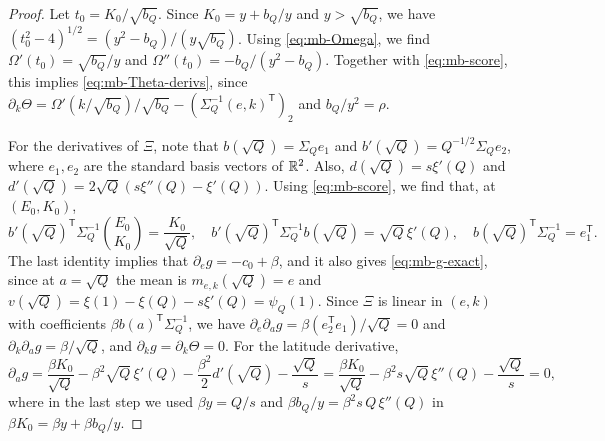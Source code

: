 \begin{proof}
Let $t_0=K_0/\sqrt{b_Q}$. Since $K_0=y+b_Q/y$ and $y>\sqrt{b_Q}$, we have $(t_0^2-4)^{1/2}=(y^2-b_Q)/(y\sqrt{b_Q})$. Using \eqref{eq:mb-Omega}, we find $\Omega'(t_0)=\sqrt{b_Q}/y$ and $\Omega''(t_0)=-b_Q/(y^2-b_Q)$. Together with \eqref{eq:mb-score}, this implies \eqref{eq:mb-Theta-derivs}, since $\partial_k\Theta=\Omega'(k/\sqrt{b_Q})/\sqrt{b_Q}-(\Sigma_Q^{-1}(e,k)^{\mathsf T})_2$ and $b_Q/y^2=\rho$.

For the derivatives of $\Xi$, note that $b(\sqrt Q)=\Sigma_Qe_1$ and $b'(\sqrt Q)=Q^{-1/2}\Sigma_Qe_2$, where $e_1,e_2$ are the standard basis vectors of $\mathbb R^2$. Also, $d(\sqrt Q)=s\xi'(Q)$ and $d'(\sqrt Q)=2\sqrt Q(s\xi''(Q)-\xi'(Q))$. Using \eqref{eq:mb-score}, we find that, at $(E_0,K_0)$,
\[
b'(\sqrt Q)^{\mathsf T}\Sigma_Q^{-1}\binom{E_0}{K_0}=\frac{K_0}{\sqrt Q},\quad b'(\sqrt Q)^{\mathsf T}\Sigma_Q^{-1}b(\sqrt Q)=\sqrt Q\,\xi'(Q),\quad b(\sqrt Q)^{\mathsf T}\Sigma_Q^{-1}=e_1^{\mathsf T}.
\]
The last identity implies that $\partial_eg=-c_0+\beta$, and it also gives \eqref{eq:mb-g-exact}, since at $a=\sqrt Q$ the mean is $m_{e,k}(\sqrt Q)=e$ and $v(\sqrt Q)=\xi(1)-\xi(Q)-s\xi'(Q)=\psi_Q(1)$. Since $\Xi$ is linear in $(e,k)$ with coefficients $\beta b(a)^{\mathsf T}\Sigma_Q^{-1}$, we have $\partial_e\partial_ag=\beta(e_2^{\mathsf T}e_1)/\sqrt Q=0$ and $\partial_k\partial_ag=\beta/\sqrt Q$, and $\partial_kg=\partial_k\Theta=0$. For the latitude derivative,
\[
\partial_ag=\frac{\beta K_0}{\sqrt Q}-\beta^2\sqrt Q\,\xi'(Q)-\frac{\beta^2}2d'(\sqrt Q)-\frac{\sqrt Q}s=\frac{\beta K_0}{\sqrt Q}-\beta^2s\sqrt Q\,\xi''(Q)-\frac{\sqrt Q}s=0,
\]
where in the last step we used $\beta y=Q/s$ and $\beta b_Q/y=\beta^2s\,Q\,\xi''(Q)$ in $\beta K_0=\beta y+\beta b_Q/y$.


\end{proof}
